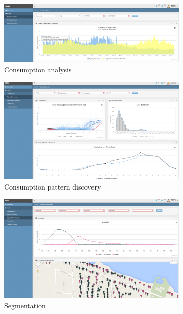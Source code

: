 \documentclass{sig-alternate}
\begin{document}
\appendix
\begin{figure}[htp]
\centering
\includegraphics[width=0.82\textwidth]{images/loadanalysistimeseries}
\vspace{-15pt}
\caption{Consumption analysis}
\label{fig:loadanalysistimeseries}
\vspace{-5pt}
\end{figure}
\begin{figure}[htp]
\centering
\includegraphics[width=0.82\textwidth]{images/patterndiscovery}
\vspace{-15pt}
\caption{Consumption pattern  discovery}
\label{fig:patterndiscovery}
\vspace{-5pt}
\end{figure}
\begin{figure}[htp]
\centering
\includegraphics[width=0.82\textwidth]{images/segmentation}
\vspace{-10pt}
\caption{Segmentation}
\label{fig:segmentation}
\vspace{-5pt}
\end{figure}
\end{document}
